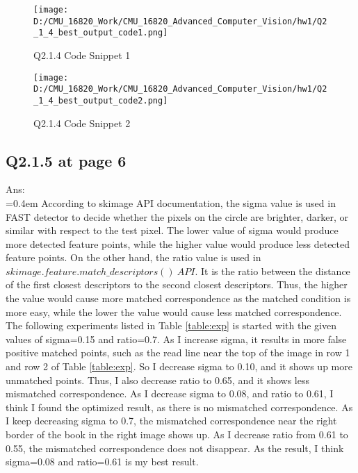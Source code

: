 \documentclass{article}
\begin{document}
	\begin{figure}[h]
		\centering
		\begin{minipage}[b]{0.45\textwidth}
			\centering
			\texttt{[image: D:/CMU\_16820\_Work/CMU\_16820\_Advanced\_Computer\_Vision/hw1/Q2\_1\_4\_best\_output\_code1.png]}  %
			\caption{Q2.1.4 Code Snippet 1}
			\label{fig:csn1}
		\end{minipage}
		\hfill  %
		\begin{minipage}[b]{0.45\textwidth}
			\centering
			\texttt{[image: D:/CMU\_16820\_Work/CMU\_16820\_Advanced\_Computer\_Vision/hw1/Q2\_1\_4\_best\_output\_code2.png]}  %
			\caption{Q2.1.4 Code Snippet 2}
			\label{fig:csn2}
		\end{minipage}
	\end{figure}
	
	\newpage
	\subsection*{Q2.1.5 at page 6}
	Ans:\\
	\hangindent=0.4em \hspace{0.3em} According to skimage API documentation, the sigma value is used in FAST detector to decide whether the pixels on the circle are brighter, darker, or similar with respect to the test pixel. The lower value of sigma would produce more detected feature points, while the higher value would produce less detected feature points. On the other hand, the ratio value is used in $skimage.feature.match\_descriptors()\ API$. It is the ratio between the distance of the first closest descriptors to the second closest descriptors. Thus, the higher the value would cause more matched correspondence as the matched condition is more easy, while the lower the value would cause less matched correspondence. The following experiments listed in Table \ref{table:exp} is started with the given values of sigma=0.15 and ratio=0.7. As I increase sigma, it results in more false positive matched points, such as the read line near the top of the image in row 1 and row 2 of Table \ref{table:exp}. So I decrease sigma to 0.10, and it shows up more unmatched points. Thus, I also decrease ratio to 0.65, and it shows less mismatched correspondence. As I decrease sigma to 0.08, and ratio to 0.61, I think I found the optimized result, as there is no mismatched correspondence. As I keep decreasing sigma to 0.7, the mismatched correspondence near the right border of the book in the right image shows up. As I decrease ratio from 0.61 to 0.55, the mismatched correspondence does not disappear. As the result, I think sigma=0.08 and ratio=0.61 is my best result.
	 
\end{document}
